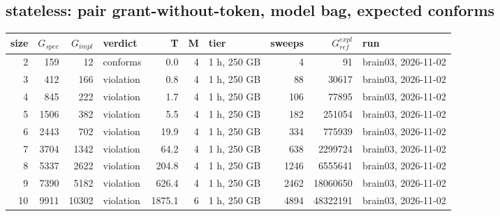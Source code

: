 \documentclass[10pt]{article}
\begin{document}
\subsection*{stateless: pair \textsf{grant-without-token}, model bag, expected conforms}
\begin{longtable}{@{}rrrlrrlrrl@{}}
\toprule
size & $G_{\mathit{spec}}$ & $G_{\mathit{impl}}$ & verdict & T & M & tier & sweeps & $G_{\mathit{ref}}^{\mathit{expl}}$ & run \\
\midrule
\endhead
\color{blue} 2 & 159 & 12 & conforms & 0.0 & 4 & 1 h, 250 GB & 4 & 91 & brain03, 2026-11-02 \\
\color{blue} 3 & 412 & 166 & violation & 0.8 & 4 & 1 h, 250 GB & 88 & 30617 & brain03, 2026-11-02 \\
\color{blue} 4 & 845 & 222 & violation & 1.7 & 4 & 1 h, 250 GB & 106 & 77895 & brain03, 2026-11-02 \\
\color{blue} 5 & 1506 & 382 & violation & 5.5 & 4 & 1 h, 250 GB & 182 & 251054 & brain03, 2026-11-02 \\
\color{blue} 6 & 2443 & 702 & violation & 19.9 & 4 & 1 h, 250 GB & 334 & 775939 & brain03, 2026-11-02 \\
\color{blue} 7 & 3704 & 1342 & violation & 64.2 & 4 & 1 h, 250 GB & 638 & 2299724 & brain03, 2026-11-02 \\
\color{blue} 8 & 5337 & 2622 & violation & 204.8 & 4 & 1 h, 250 GB & 1246 & 6555641 & brain03, 2026-11-02 \\
\color{blue} 9 & 7390 & 5182 & violation & 626.4 & 4 & 1 h, 250 GB & 2462 & 18060650 & brain03, 2026-11-02 \\
\color{blue} 10 & 9911 & 10302 & violation & 1875.1 & 6 & 1 h, 250 GB & 4894 & 48322191 & brain03, 2026-11-02 \\
\bottomrule
\end{longtable}
\end{document}
